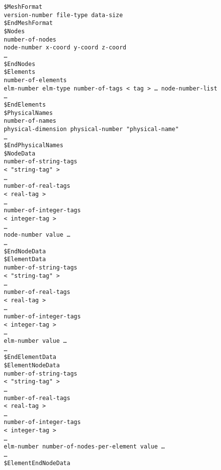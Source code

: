 \begin{verbatim}
	$MeshFormat
	version-number file-type data-size
	$EndMeshFormat
	$Nodes
	number-of-nodes
	node-number x-coord y-coord z-coord
	…
	$EndNodes
	$Elements
	number-of-elements
	elm-number elm-type number-of-tags < tag > … node-number-list
	…
	$EndElements
	$PhysicalNames
	number-of-names
	physical-dimension physical-number "physical-name"
	…
	$EndPhysicalNames
	$NodeData
	number-of-string-tags
	< "string-tag" >
	…
	number-of-real-tags
	< real-tag >
	…
	number-of-integer-tags
	< integer-tag >
	…
	node-number value …
	…
	$EndNodeData
	$ElementData
	number-of-string-tags
	< "string-tag" >
	…
	number-of-real-tags
	< real-tag >
	…
	number-of-integer-tags
	< integer-tag >
	…
	elm-number value …
	…
	$EndElementData
	$ElementNodeData
	number-of-string-tags
	< "string-tag" >
	…
	number-of-real-tags
	< real-tag >
	…
	number-of-integer-tags
	< integer-tag >
	…
	elm-number number-of-nodes-per-element value …
	…
	$ElementEndNodeData
\end{verbatim}
